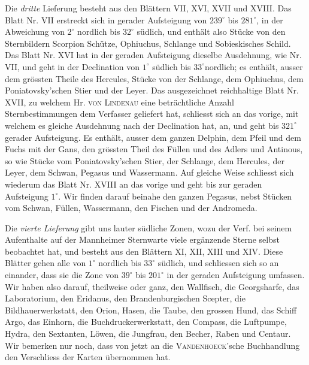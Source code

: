 Die \emph{dritte} Lieferung besteht aus den Blättern VII, XVI, XVII und XVIII. Das Blatt Nr. VII erstreckt sich in gerader Aufsteigung von $239^\circ$ bis $281^\circ$, in der Abweichung von $2^\circ$ nordlich bis $32^\circ$ südlich, und enthält also Stücke von den Sternbildern Scorpion Schütze, Ophiuchus, Schlange und Sobieskisches Schild. Das Blatt Nr. XVI hat in der geraden Aufsteigung dieselbe Ausdehnung, wie Nr. VII, und geht in der Declination von $1^\circ$ südlich bis $33^\circ$nordlich; es enthält, ausser dem grössten Theile des Hercules, Stücke von der Schlange, dem Ophiuchus, dem Poniatovsky'schen Stier und der Leyer. Das ausgezeichnet reichhaltige Blatt Nr. XVII, zu welchem Hr. \textsc{von Lindenau} eine beträchtliche Anzahl Sternbestimmungen dem Verfasser geliefert hat, schliesst sich an das vorige, mit welchem es gleiche Ausdehnung nach der Declination hat, an, und geht bis $321^\circ$ gerader Aufsteigung. Es enthält, ausser dem ganzen Delphin, dem Pfeil und dem Fuchs mit der Gans, den grössten Theil des Füllen und des Adlers und Antinous, so wie Stücke vom Poniatovsky'schen Stier, der Schlange, dem Hercules, der Leyer, dem Schwan, Pegasus und Wassermann. Auf gleiche Weise schliesst sich wiederum das Blatt Nr. XVIII an das vorige und geht bis zur geraden Aufsteigung $1^\circ$. Wir finden darauf beinahe den ganzen Pegasus, nebst Stücken vom Schwan, Füllen, Wassermann, den Fischen und der Andromeda.

Die \emph{vierte Lieferung} gibt uns lauter südliche Zonen, wozu der Verf. bei seinem Aufenthalte auf der Mannheimer Sternwarte viele ergänzende Sterne selbst beobachtet hat, und besteht aus den Blättern XI, XII, XIII und XIV. Diese Blätter gehen alle von $1^\circ$ nordlich bis $33^\circ$ südlich, und schliessen sich so an einander, dass sie die Zone von $39^\circ$ bis $201^\circ$ in der geraden Aufsteigung umfassen. Wir haben also darauf, theilweise oder ganz, den Wallfisch, die Georgsharfe, das Laboratorium, den Eridanus, den Brandenburgischen Scepter, die Bildhauerwerkstatt, den Orion, Hasen, die Taube, den grossen Hund, das Schiff Argo, das Einhorn, die Buchdruckerwerkstatt, den Compass, die Luftpumpe, Hydra, den Sextanten, Löwen, die Jungfrau, den Becher, Raben und Centaur. Wir bemerken nur noch, dass von jetzt an die \textsc{Vandenhoeck}'sche Buchhandlung den Verschliess der Karten übernommen hat.
